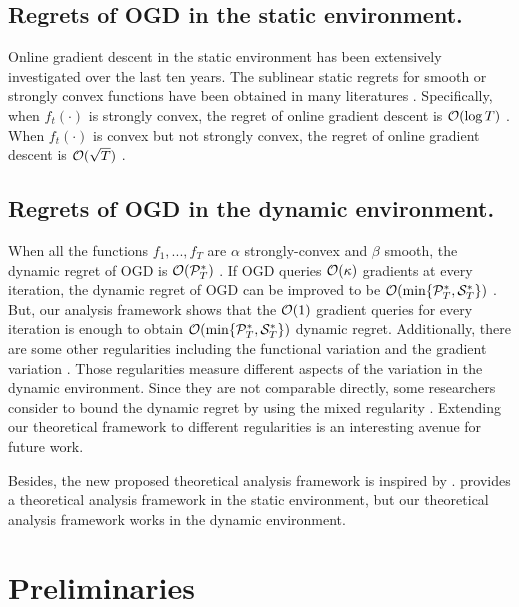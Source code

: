 \documentclass{article}
\begin{document}
\subsection{Regrets of OGD in the static environment.}
Online gradient descent in the static environment has been extensively investigated over the last ten years. The sublinear static regrets for smooth or strongly convex functions have been obtained in many literatures \cite{ShalevShwartz:2012dz,Hazan2016Introduction,Duchi:2011,Zinkevich:2003}. Specifically, when $f_t(\cdot)$ is strongly convex, the regret of online gradient descent is ${\mathcal{O}}(\log T)$ \cite{Hazan2016Introduction}. When 
$f_t(\cdot)$ is convex but not strongly convex, the regret of online gradient descent is ${\mathcal{O}}(\sqrt{T})$ \cite{Hazan2016Introduction}.


\subsection{Regrets of OGD in the dynamic environment.}
When all the functions $f_1, ..., f_T$ are $\alpha $ strongly-convex and $\beta$ smooth, the dynamic regret of OGD is ${\mathcal{O}}({\mathcal{P}}_T^{\ast})$ \cite{Mokhtari:2016jz,Yang:2016ud}. If OGD queries ${\mathcal{O}}(\kappa)$ gradients at every iteration, the dynamic regret of OGD can be improved to be ${\mathcal{O}}(\min\{{\mathcal{P}}_T^{\ast}, {\mathcal{S}}_T^{\ast}\})$ \cite{Zhang:2016wl}. But, our analysis framework shows that the ${\mathcal{O}}(1)$ gradient queries for every iteration is enough to  obtain ${\mathcal{O}}(\min\{{\mathcal{P}}_T^{\ast}, {\mathcal{S}}_T^{\ast}\})$ dynamic regret.  Additionally,  there are some other regularities including the functional variation \cite{Zhu:2015tr,Besbes:2015gb} and  the gradient variation \cite{Chiang2012Online}. Those regularities measure different aspects of the variation in the dynamic environment. Since they are not comparable directly, some researchers consider to bound the dynamic regret by using the mixed regularity \cite{Jadbabaie:2015wg}. Extending our theoretical framework to different regularities is an interesting  avenue for future work.

Besides, the new proposed theoretical analysis framework is inspired by \cite{Joulani:2017un}. \cite{Joulani:2017un} provides a theoretical analysis framework in the static environment, but our theoretical analysis framework works in the dynamic environment. 

\section{Preliminaries}
\label{sect_preliminary}
\end{document}
